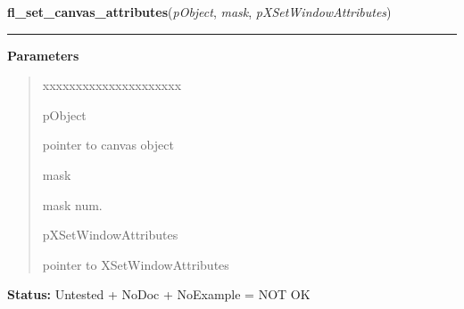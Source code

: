 \hspace{.8\funcindent}\begin{boxedminipage}{\funcwidth}

    \raggedright \textbf{fl\_set\_canvas\_attributes}(\textit{pObject}, \textit{mask}, \textit{pXSetWindowAttributes})

    \vspace{-1.5ex}

    \rule{\textwidth}{0.5\fboxrule}
\setlength{\parskip}{2ex}
\setlength{\parskip}{1ex}
      \textbf{Parameters}
      \vspace{-1ex}

      \begin{quote}
        \begin{Ventry}{xxxxxxxxxxxxxxxxxxxxx}

          \item[pObject]

          pointer to canvas object

          \item[mask]

          mask num.

          \item[pXSetWindowAttributes]

          pointer to XSetWindowAttributes

        \end{Ventry}

      \end{quote}

\textbf{Status:} Untested + NoDoc + NoExample = NOT OK



    \end{boxedminipage}

    \label{xformslib:library:fl_add_canvas_handler}

    \vspace{0.5ex}

